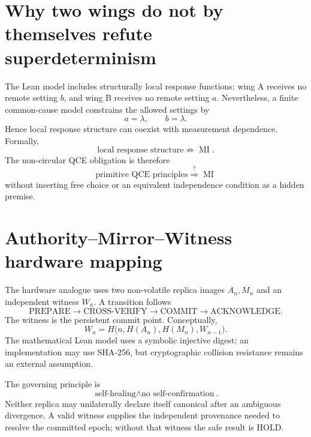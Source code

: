 \documentclass[11pt,a4paper]{article}
\begin{document}
\section{Why two wings do not by themselves refute superdeterminism}
The Lean model includes structurally local response functions: wing A receives no remote setting $b$, and wing B receives no remote setting $a$. Nevertheless, a finite common-cause model constrains the allowed settings by
\[
a=\lambda,\qquad b=\lambda.
\]
Hence local response structure can coexist with measurement dependence. Formally,
\[
\boxed{\text{local response structure}\not\Rightarrow\operatorname{MI}}.
\]
The non-circular QCE obligation is therefore
\[
\boxed{\text{primitive QCE principles}\stackrel{?}{\Longrightarrow}\operatorname{MI}}
\]
without inserting free choice or an equivalent independence condition as a hidden premise.

\section{Authority--Mirror--Witness hardware mapping}
The hardware analogue uses two non-volatile replica images $A_n,M_n$ and an independent witness $W_n$. A transition follows
\[
\text{PREPARE}\rightarrow\text{CROSS-VERIFY}\rightarrow\text{COMMIT}\rightarrow\text{ACKNOWLEDGE}.
\]
The witness is the persistent commit point. Conceptually,
\[
W_n=H\bigl(n,H(A_n),H(M_n),W_{n-1}\bigr).
\]
The mathematical Lean model uses a symbolic injective digest; an implementation may use SHA-256, but cryptographic collision resistance remains an external assumption.

The governing principle is
\[
\boxed{\text{self-healing}\land\text{no self-confirmation}}.
\]
Neither replica may unilaterally declare itself canonical after an ambiguous divergence. A valid witness supplies the independent provenance needed to resolve the committed epoch; without that witness the safe result is HOLD.
\end{document}
